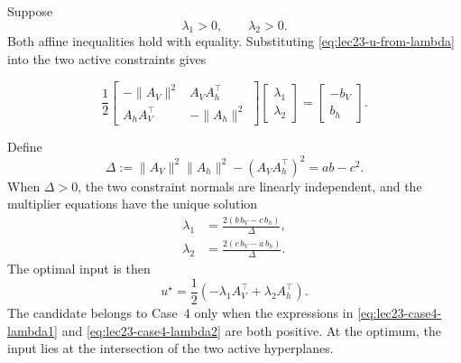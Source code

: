 \documentclass[../../master-handout.tex]{subfiles}
\begin{document}
Suppose
\begin{equation}
    \lambda_1>0,
    \qquad
    \lambda_2>0.
\end{equation}
Both affine inequalities hold with equality. Substituting \eqref{eq:lec23-u-from-lambda} into the two active constraints gives
\begin{fullwidth}
\begin{equation}
    \frac{1}{2}
    \begin{bmatrix}
        -\|A_V\|^2 & A_VA_h^\top
        \\
        A_hA_V^\top & -\|A_h\|^2
    \end{bmatrix}
    \begin{bmatrix}
        \lambda_1
        \\
        \lambda_2
    \end{bmatrix}
    =
    \begin{bmatrix}
        -b_V
        \\
        b_h
    \end{bmatrix}.
    \label{eq:lec23-case4-linear-system}
\end{equation}
\end{fullwidth}
Define
\begin{equation}
    \Delta
    :=
    \|A_V\|^2\|A_h\|^2
    -
    \left(A_VA_h^\top\right)^2
    =
    ab-c^2.
    \label{eq:lec23-delta}
\end{equation}
When $\Delta>0$, the two constraint normals are linearly independent, and the multiplier equations have the unique solution
\begin{align}
    \lambda_1
    &=
    \frac{
        2\left(
            b\,b_V-c\,b_h
        \right)
    }{
        \Delta
    },
    \label{eq:lec23-case4-lambda1}
    \\
    \lambda_2
    &=
    \frac{
        2\left(
            c\,b_V-a\,b_h
        \right)
    }{
        \Delta
    }.
    \label{eq:lec23-case4-lambda2}
\end{align}
The optimal input is then
\begin{equation}
    u^\star
    =
    \frac{1}{2}
    \left(
        -\lambda_1A_V^\top
        +
        \lambda_2A_h^\top
    \right).
    \label{eq:lec23-case4-u}
\end{equation}
The candidate belongs to Case~4 only when the expressions in \eqref{eq:lec23-case4-lambda1} and \eqref{eq:lec23-case4-lambda2} are both positive. At the optimum, the input lies at the intersection of the two active hyperplanes.
\end{document}
